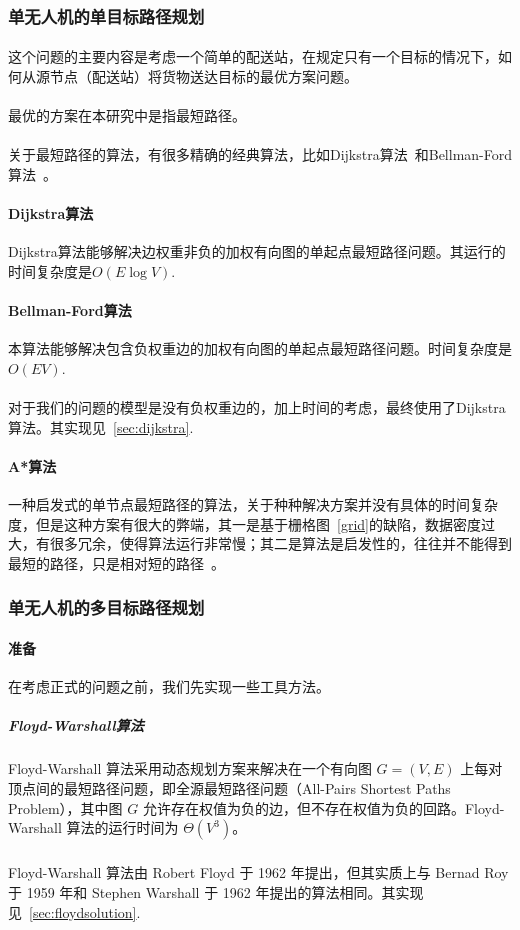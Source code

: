 \documentclass[UTF8,a4paper]{ctexart}
\begin{document}
\subsubsection{单无人机的单目标路径规划}
\paragraph{}这个问题的主要内容是考虑一个简单的配送站，在规定只有一个目标的情况下，如何从源节点（配送站）将货物送达目标的最优方案问题。
\paragraph{}最优的方案在本研究中是指最短路径。
\paragraph{}关于最短路径的算法，有很多精确的经典算法，比如Dijkstra算法~\cite{felner2011position}和Bellman-Ford算法~\cite{bellman1958routing}。
\paragraph{Dijkstra算法}Dijkstra算法能够解决边权重非负的加权有向图的单起点最短路径问题。其运行的时间复杂度是$O(E\log{V})$.
\paragraph{Bellman-Ford算法}本算法能够解决包含负权重边的加权有向图的单起点最短路径问题。时间复杂度是$O(EV)$.
\paragraph{}对于我们的问题的模型是没有负权重边的，加上时间的考虑，最终使用了Dijkstra算法。其实现见~\ref{sec:dijkstra}.

\paragraph{A*算法}一种启发式的单节点最短路径的算法，关于种种解决方案并没有具体的时间复杂度，但是这种方案有很大的弊端，其一是基于栅格图~\ref{grid}的缺陷，数据密度过大，有很多冗余，使得算法运行非常慢；其二是算法是启发性的，往往并不能得到最短的路径，只是相对短的路径~\cite{astarredbloggames}。


\subsubsection{单无人机的多目标路径规划}
\paragraph{准备}在考虑正式的问题之前，我们先实现一些工具方法。
\subparagraph{Floyd-Warshall算法}Floyd-Warshall 算法采用动态规划方案来解决在一个有向图 $G = (V, E)$ 上每对顶点间的最短路径问题，即全源最短路径问题（All-Pairs Shortest Paths Problem），其中图 $G$ 允许存在权值为负的边，但不存在权值为负的回路。Floyd-Warshall 算法的运行时间为 $Θ(V^3)$。
\subparagraph{}Floyd-Warshall 算法由 Robert Floyd 于 1962 年提出，但其实质上与 Bernad Roy 于 1959 年和 Stephen Warshall 于 1962 年提出的算法相同。其实现见~\ref{sec:floydsolution}.
\end{document}
